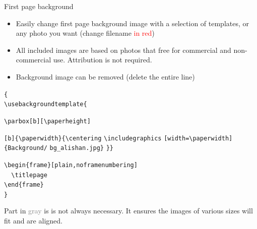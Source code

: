 \documentclass[10pt,t]{beamer}
\begin{document}
\begin{frame}[fragile]{First page background}\label{background_image}
    \begin{itemize}
        \item Easily change first page background image with a selection of templates, or any photo you want (change filename \textcolor{red}{in red})
        \item All included images are based on photos that free for commercial and non-commercial use. Attribution is not required.
        \item Background image can be removed (delete the entire line)
    \end{itemize}
    
  \vspace{6pt}  
\verb+{+ \\

\verb+\usebackgroundtemplate{+{\color{gray} \verb+\parbox[b][\paperheight]+

    \verb+[b]{\paperwidth}{\centering+
\color{black}\verb+\includegraphics+
\color{gray} \verb+[width=\paperwidth]+\color{black}\verb+{Background/+\color{red} \verb+bg_alishan.jpg+\color{black}\verb+}+\color{gray} \verb+}+\color{black}\verb+}+ 
}

\smallskip
\verb+\begin{frame}[plain,noframenumbering]+ \\
\verb+  \titlepage+ \\
\verb+\end{frame}+ \\
\verb+}+

\vspace{12pt}  
\footnotesize{Part in \textcolor{gray}{gray} is is not always necessary. It ensures the images of various sizes will fit and are aligned.}
\end{frame}
\end{document}
